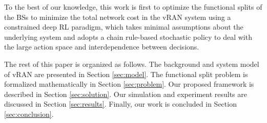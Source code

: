 To the best of our knowledge, this work is ﬁrst to optimize the functional splits of the BSs to minimize the total network cost in the vRAN system using a constrained deep RL paradigm, which takes minimal assumptions about the underlying system and adopts a chain rule-based stochastic policy to deal with the large action space and interdependence between decisions.








The rest of this paper is organized as follows. The background and system model of vRAN are presented in Section \ref{sec:model}. The functional split problem is formalized mathematically in Section \ref{sec:problem}. Our proposed framework is described in Section \ref{sec:solution}. Our simulation and experiment results are discussed in Section \ref{sec:results}. Finally, our work is concluded in Section \ref{sec:conclusion}.
